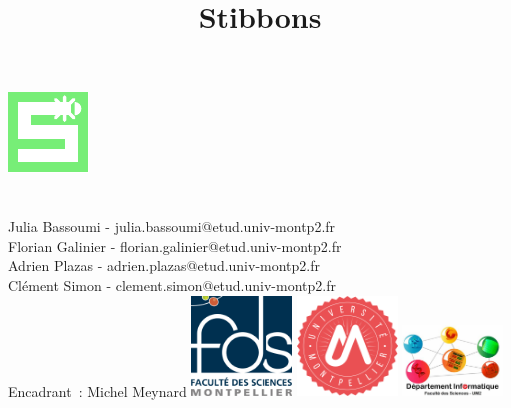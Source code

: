 \documentclass[a4paper,11pt]{report}
\newcommand{\+}{\discretionary{\mbox{\scriptsize$\hookleftarrow$}}{}{}}
\begin{document}
\title{Stibbons}

\makeatletter
  \begin{titlepage}
  \centering
        \includegraphics[height=0.2\textheight]{doc/gestionProjet/stibbons.pdf}\\
        \vfill
        {\LARGE \textbf{\@title}}\\
        \vspace{1cm}
		{\large \textbf{\@date}}\\
		\vspace{1cm}
		{\large Julia Bassoumi - julia.bassoumi@etud.univ-montp2.fr\\Florian Galinier - florian.galinier@etud.univ-montp2.fr\\Adrien Plazas - adrien.plazas@etud.univ-montp2.fr\\Clément Simon - clement.simon@etud.univ-montp2.fr\\}
		\vspace{1cm}
		{\large Encadrant~: Michel Meynard}
        \vfill
        \includegraphics[width=0.2\textwidth]{doc/gestionProjet/fds.png}
        \hfill
        \includegraphics[width=0.2\textwidth]{doc/gestionProjet/UM2.png}
        \hfill
        \includegraphics[width=0.2\textwidth]{doc/gestionProjet/depinfo.jpeg}
  \end{titlepage}
\makeatother

\tableofcontents
\end{document}
